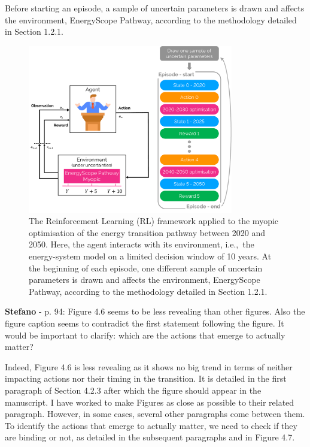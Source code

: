 \documentclass[12pt,a4paper]{article}
\def\ie{i.e.,\ }
\begin{document}
\begin{mdframed}[style=manuscript] %
Before starting an episode, a sample of uncertain parameters is drawn and affects the environment, EnergyScope Pathway, according to the methodology detailed in Section 1.2.1. 
\end{mdframed}

\begin{figure}[!htbp]
\centering
\includegraphics[width=0.8\textwidth]{Schematics_RL.pdf}
\caption{The Reinforcement Learning (RL) framework applied to the myopic optimisation of the energy transition pathway between 2020 and 2050. Here, the agent interacts with its environment, \ie the energy-system model on a limited decision window of 10 years. At the beginning of each episode, one different sample of uncertain parameters is drawn and affects the environment, EnergyScope Pathway, according to the methodology detailed in Section 1.2.1.}
\label{fig:Schematics_RL}
\end{figure}


\begin{mdframed}[style=comment] %
{\color{orange} \textbf{Stefano}} - p. 94: Figure 4.6 seems to be less revealing than other figures. Also the figure caption seems to contradict the first statement following the figure. It would be important to clarify: which are the actions that emerge to actually matter?
\end{mdframed}

\noindent Indeed, Figure 4.6 is less revealing as it shows no big trend in terms of neither impacting actions nor their timing in the transition.  It is detailed in the first paragraph of Section 4.2.3 after which the figure should appear in the manuscript. I have worked to make Figures as close as possible to their related paragraph. However, in some cases, several other paragraphs come between them. To identify the actions that emerge to actually matter, we need to check if they are binding or not, as detailed in the subsequent paragraphs and in Figure 4.7.
\end{document}

